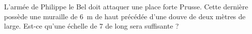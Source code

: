 
\begin{exercice}\label{exosmath-0970}

    L'armée de Philippe le Bel doit attaquer une place forte Prusse. Cette dernière possède une muraille de \SI{6}{\meter} de haut précédée d'une douve de deux mètres de large. Est-ce qu'une échelle de \unit{7}{\meter} de long sera suffisante ?

\end{exercice}
